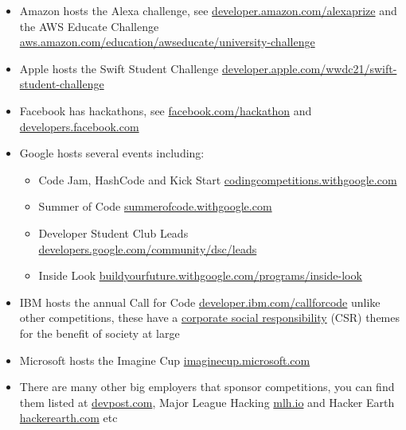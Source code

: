 \documentclass[
]{book}
\providecommand{\tightlist}{%
  \setlength{\itemsep}{0pt}\setlength{\parskip}{0pt}}
\begin{document}
\begin{itemize}
\tightlist
\item
  Amazon hosts the Alexa challenge, see \href{https://developer.amazon.com/alexaprize/challenges/current-challenge/rules}{developer.amazon.com/alexaprize} and the AWS Educate Challenge \href{https://aws.amazon.com/education/awseducate/university-challenge/}{aws.amazon.com/education/awseducate/university-challenge}
\item
  Apple hosts the Swift Student Challenge \href{https://developer.apple.com/wwdc21/swift-student-challenge/}{developer.apple.com/wwdc21/swift-student-challenge}
\item
  Facebook has hackathons, see \href{https://en-gb.facebook.com/hackathon}{facebook.com/hackathon} and \href{https://developers.facebook.com/}{developers.facebook.com}
\item
  Google hosts several events including:

  \begin{itemize}
  \tightlist
  \item
    Code Jam, HashCode and Kick Start \href{https://codingcompetitions.withgoogle.com/}{codingcompetitions.withgoogle.com}
  \item
    Summer of Code \href{https://summerofcode.withgoogle.com/}{summerofcode.withgoogle.com} \citep{gsoc}
  \item
    Developer Student Club Leads \href{https://developers.google.com/community/dsc/leads}{developers.google.com/community/dsc/leads}
  \item
    Inside Look \href{https://buildyourfuture.withgoogle.com/programs/inside-look/}{buildyourfuture.withgoogle.com/programs/inside-look}
  \end{itemize}
\item
  IBM hosts the annual Call for Code \href{https://developer.ibm.com/callforcode}{developer.ibm.com/callforcode} unlike other competitions, these have a \href{https://en.wikipedia.org/wiki/Corporate_social_responsibility}{corporate social responsibility} (CSR) themes for the benefit of society at large
\item
  Microsoft hosts the Imagine Cup \href{https://imaginecup.microsoft.com/}{imaginecup.microsoft.com}
\item
  There are many other big employers that sponsor competitions, you can find them listed at \href{https://devpost.com}{devpost.com}, Major League Hacking \href{https://mlh.io/}{mlh.io} and Hacker Earth \href{https://www.hackerearth.com/}{hackerearth.com} etc
\end{itemize}
\end{document}

